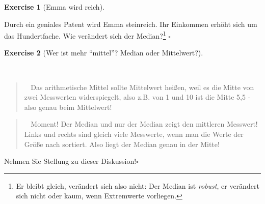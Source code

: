 \documentclass[
  letterpaper,
  DIV=11,
  numbers=noendperiod]{scrartcl}
\theoremstyle{definition}
\theoremstyle{definition}
\newtheorem{exercise}{Exercise}[section]
\theoremstyle{definition}
\theoremstyle{remark}
\begin{document}
\begin{exercise}[Emma wird
reich]\protect\hypertarget{exr-md2}{}\label{exr-md2}

Durch ein geniales Patent wird Emma steinreich. Ihr Einkommen erhöht
sich um das Hundertfache. Wie verändert sich der Median?\footnote{Er
  bleibt gleich, verändert sich also nicht: Der Median ist
  \emph{robust}, er verändert sich nicht oder kaum, wenn Extremwerte
  vorliegen.} \(\square\)

\end{exercise}

\begin{exercise}[Wer ist mehr ``mittel''? Median oder
Mittelwert?]\protect\hypertarget{exr-mw-md}{}\label{exr-mw-md}

~

\begin{quote}
🧑‍🎓 Das arithmetische Mittel sollte Mittelwert heißen, weil es die Mitte
von zwei Messwerten widerspiegelt, also z.B. von 1 und 10 ist die Mitte
5,5 - also genau beim Mittelwert!
\end{quote}

\begin{quote}
👩‍🎓 Moment! Der Median und nur der Median zeigt den mittleren Messwert!
Links und rechts sind gleich viele Messwerte, wenn man die Werte der
Größe nach sortiert. Also liegt der Median genau in der Mitte!
\end{quote}

Nehmen Sie Stellung zu dieser Diskussion!\(\square\)

\end{exercise}
\end{document}
